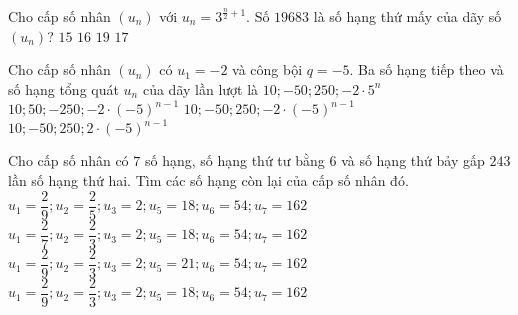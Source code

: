 \begin{ex}%
Cho cấp số nhân $(u_n)$ với $u_n = 3^{\frac{n}{2}+1}$. Số $19683$ là số hạng thứ mấy của dãy số $(u_n)$?
\choice
{$15$}
{\True $16$}
{$19$}
{$17$}
\end{ex}
\begin{ex}%
Cho cấp số nhân $(u_n)$ có $u_1=-2$ và công bội $q=-5$. Ba số hạng tiếp theo và số hạng tổng quát $u_n$ của dãy lần lượt là
\choice
{$10; -50; 250; -2\cdot 5^n$}
{$10; 50; -250; -2\cdot (-5)^{n-1}$}
{\True $10; -50; 250; -2\cdot (-5)^{n-1}$}
{$10; -50; 250; 2\cdot (-5)^{n-1}$}
\end{ex} 
\begin{ex}%
Cho cấp số nhân có $7$ số hạng, số hạng thứ tư bằng $6$ và số hạng thứ bảy gấp $243$ lần số hạng thứ hai. Tìm các số hạng còn lại của cấp số nhân đó.
\choice
{$u_1=\dfrac{2}{9};u_2=\dfrac{2}{5};u_3=2;u_5=18;u_6=54;u_7=162$}
{$u_1=\dfrac{2}{7};u_2=\dfrac{2}{3};u_3=2;u_5=18;u_6=54;u_7=162$}
{$u_1=\dfrac{2}{9};u_2=\dfrac{2}{3};u_3=2;u_5=21;u_6=54;u_7=162$}
{\True $u_1=\dfrac{2}{9};u_2=\dfrac{2}{3};u_3=2;u_5=18;u_6=54;u_7=162$}
\end{ex}
